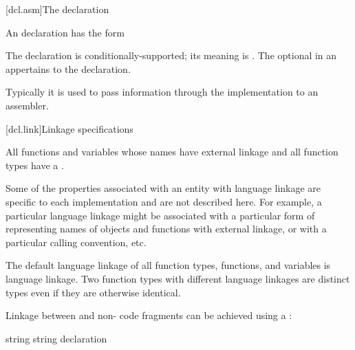 \documentclass{wg21}
\begin{document}
[dcl.asm]{The  declaration}%
%
%

\pnum
An  declaration has the form

\begin{bnf}
    \br
      \terminal{(}  \terminal{)} \terminal{;}
\end{bnf}

The  declaration is conditionally-supported; its meaning is
.
The optional  in
an  appertains to the  declaration.
\begin{note}
    Typically it is used to pass information through the implementation to
    an assembler.
\end{note}

[dcl.link]{Linkage specifications}%

\pnum
All functions and variables whose names have external linkage
and all function types
have a .
\begin{note}
    Some of the properties associated with an entity with language linkage
    are specific to each implementation and are not described here. For
    example, a particular language linkage might be associated with a
    particular form of representing names of objects and functions with
    external linkage, or with a particular calling convention, etc.
\end{note}
The default language linkage of all function types, functions, and
variables is \Cpp{} language linkage. Two function types with
different language linkages are distinct types even if they are
otherwise identical.

\pnum
Linkage between \Cpp{} and  non-\Cpp{} code fragments can
be achieved using a :

%
%
%
\begin{bnf}
    \br
     string \terminal{\{}  \terminal{\}}\br
     string declaration
\end{bnf}
\end{document}
